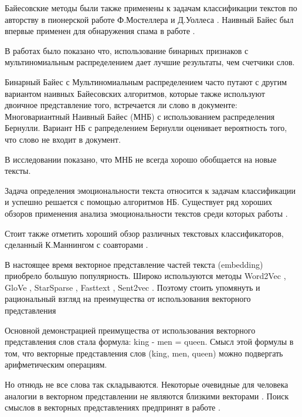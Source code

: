 Байесовские методы \cite{bayes1763essay} были также применены к задачам классификации текстов по авторству в пионерской работе Ф.Мостеллера и Д.Уоллеса \cite{mosteller1963inference}. 
Наивный Байес был впервые применен для обнаружения спама в работе \cite{sahami1998bayesian}.

В работах \cite{metsis2006spam, wang2012baselines, pang2002thumbs} было показано что, использование бинарных признаков с мультиномиальным распределением дает лучшие результаты, чем счетчики слов. 

Бинарный Байес с Мультиномиальным распределением часто путают с другим вариантом наивных Байесовских алгоритмов, которые также используют двоичное представление того, встречается ли слово в документе: Многовариантный Наивный Байес (МНБ) с использованием распределения Бернулли. 
Вариант НБ с рапределением Бернулли оценивает вероятность того, что слово не входит в документ. 

В исследовании \cite{mccallum1998comparison} показано, что МНБ не всегда хорошо обобщается на новые тексты.

Задача определения эмоциональности текста относится к задачам классификации и успешно решается с помощью алгоритмов НБ.  
Существует ряд хороших обзоров применения анализа эмоциональности текстов среди которых работы \cite{pang2008opinion, liu2012survey, stamatatos2009survey}.

Стоит также отметить хороший обзор различных текстовых классификаторов, сделанный К.Маннингом с соавторами \cite{schutze2008introduction}.

В настоящее время векторное представление частей текста (embedding)
приобрело большую популярность. Широко используются методы Word2Vec
\cite{mikolov2013efficient}, GloVe \cite{pennington2014glove},
StarSparse \cite{wu2017starspace}, Fasttext \cite{bojanowski2016enriching}, Sent2vec
\cite{pagliardini2017unsupervised}. 
Поэтому стоить упомянуть и рациональный взгляд на преимущества
от использования векторного представления  

Основной демонстрацией преимущества от использования векторного
представления слов стала формула: king - men = queen.
Смысл этой формулы в том, что векторные представления слов (king, men, queen) можно подвергать арифметическим операциям. 

Но отнюдь не все слова так складываются. Некоторые очевидные для человека аналогии в векторном представлении не являются близкими векторами \cite{finley2017analogies}.
Поиск смыслов в векторных представлениях предпринят в работе \cite{pelevina2017making,panchenko2017unsupervised}.

